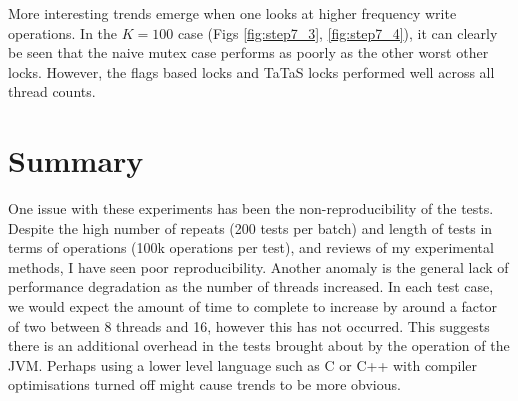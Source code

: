\documentclass[11pt]{article}
\begin{document}
More interesting trends emerge when one looks at higher frequency write operations. In the $K=100$ case (Figs \ref{fig:step7_3}, \ref{fig:step7_4}), it can clearly be seen that the naive mutex case performs as poorly as the other worst other locks. However, the flags based locks and TaTaS locks performed well across all thread counts.

\section{Summary}

One issue with these experiments has been the non-reproducibility of the tests. Despite the high number of repeats (200 tests per batch) and length of tests in terms of operations (100k operations per test), and reviews of my experimental methods, I have seen poor reproducibility. Another anomaly is the general lack of performance degradation as the number of threads increased. In each test case, we would expect the amount of time to complete to increase by around a factor of two between 8 threads and 16, however this has not occurred. This suggests there is an additional overhead in the tests brought about by the operation of the JVM. Perhaps using a lower level language such as C or C++ with compiler optimisations turned off might cause trends to be more obvious.
\end{document}
